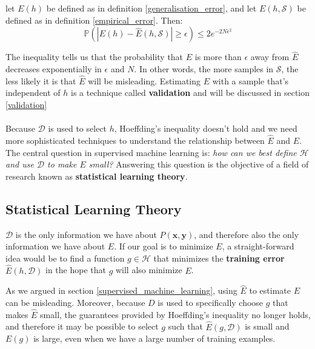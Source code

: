 \begin{theorem}
	let $E(h)$ be defined as in definition \ref{generalisation_error}, and let $E(h, \mathcal{S})$ be defined as in definition \ref{empirical_error}. Then:
	$$
	\mathbb{P}\left( |E(h) - \hat{E}(h, \mathcal{S})| \geq \epsilon \right) \leq 2e^{-2N\epsilon^2}
	$$
\end{theorem}

The inequality tells us that the probability that $E$ is more than $\epsilon$ away from $\hat{E}$ decreases exponentially in $\epsilon$ and $N$. In other words, the more samples in $\mathcal{S}$, the less likely it is that $\hat{E}$ will be misleading. Estimating $E$ with a sample that's independent of $h$ is a technique called \textbf{validation} and will be discussed in section \ref{validation}
\\\\
Because $\mathcal{D}$ is used to select $h$, Hoeffding's inequality doesn't hold and we need more sophisticated techniques to understand the relationship between $\hat{E}$ and $E$. The central question in supervised machine learning is: \textit{how can we best define $\mathcal{H}$ and use $\mathcal{D}$ to make $E$ small?} Answering this question is the objective of a field of research known as \textbf{statistical learning theory}.

\subsection{Statistical Learning Theory}
\label{statistical_learning_theory}
$\mathcal{D}$ is the only information we have about $P(\mathbf{x}, \mathbf{y})$, and therefore also the only information we have about $E$. If our goal is to minimize $E$, a straight-forward idea would be to find a function $g \in \mathcal{H}$ that minimizes the \textbf{training error} $\hat{E}(h, \mathcal{D})$ in the hope that $g$ will also minimize $E$. 

As we argued in section \ref{supervised_machine_learning}, using $\hat{E}$ to estimate $E$ can be misleading. Moreover, because $D$ is used to specifically choose $g$ that makes $\hat{E}$ small, the guarantees provided by Hoeffding's inequality no longer holds, and therefore it may be possible to select $g$ such that $\hat{E}(g, \mathcal{D})$ is small and $E(g)$ is large, even when we have a large number of training examples.

